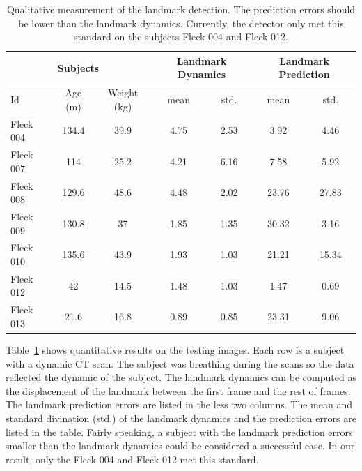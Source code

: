 \documentclass{article}
\begin{document}
\begin{table}
  \centering
  \begin{tabular}{|lcc|c|c|c|c|}
  \hline
  \multicolumn{3}{|c|}{Subjects} & \multicolumn{2}{|c|}{Landmark Dynamics} & \multicolumn{2}{|c|}{Landmark Prediction} \\
  \hline
  Id  & Age (m) & Weight (kg) & mean & std. & mean & std. \\
  \hline
  Fleck 004 & 134.4   & 39.9  & 4.75 & 2.53 & 3.92 & 4.46 \\
  Fleck 007 & 114     & 25.2  & 4.21 & 6.16 & 7.58 & 5.92 \\
  Fleck 008 & 129.6   & 48.6  & 4.48 & 2.02 & 23.76 & 27.83 \\
  Fleck 009 & 130.8   & 37    & 1.85 & 1.35 & 30.32 & 3.16 \\
  Fleck 010 & 135.6   & 43.9  & 1.93 & 1.03 & 21.21 & 15.34 \\
  Fleck 012 &  42     & 14.5  & 1.48 & 1.03 & 1.47 & 0.69 \\
  Fleck 013 &  21.6   & 16.8  & 0.89 & 0.85 & 23.31 & 9.06 \\
  \hline
  \end{tabular}
  \caption{Qualitative measurement of the landmark detection. The prediction errors should be lower than the landmark dynamics. Currently, the detector only met this standard on the subjects Fleck 004 and Fleck 012.
   }
  \label{tab:Fleck_landmarks}
\end{table}

Table~\ref{tab:Fleck_landmarks} shows quantitative results on the testing images.
Each row is a subject with a dynamic CT scan.
The subject was breathing during the scans so the data reflected the dynamic of the subject.
The landmark dynamics can be computed as the displacement of the landmark between the first frame and the rest of frames.
The landmark prediction errors are listed in the less two columns.
The mean and standard divination (std.) of the landmark dynamics and the prediction errors are listed in the table.
Fairly speaking, a subject with the landmark prediction errors smaller than the landmark dynamics could be considered a successful case.
In our result, only the Fleck 004 and Fleck 012 met this standard.
\end{document}
